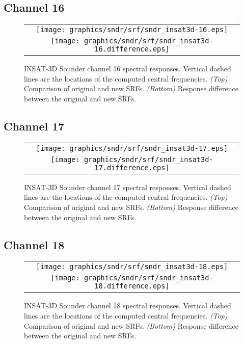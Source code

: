 \subsection{Channel 16}
\begin{figure}[H]
  \label{fig:sndr_ch16}
  \centering
  \begin{tabular}{c}
    \texttt{[image: graphics/sndr/srf/sndr\_insat3d-16.eps]} \\
    \texttt{[image: graphics/sndr/srf/sndr\_insat3d-16.difference.eps]}
  \end{tabular}
  \caption{INSAT-3D Sounder channel 16 spectral responses. Vertical dashed lines are the locations of the computed central frequencies. \emph{(Top)} Comparison of original and new SRFs. \emph{(Bottom)} Response difference between the original and new SRFs.}
\end{figure}

\subsection{Channel 17}
\begin{figure}[H]
  \label{fig:sndr_ch17}
  \centering
  \begin{tabular}{c}
    \texttt{[image: graphics/sndr/srf/sndr\_insat3d-17.eps]} \\
    \texttt{[image: graphics/sndr/srf/sndr\_insat3d-17.difference.eps]}
  \end{tabular}
  \caption{INSAT-3D Sounder channel 17 spectral responses. Vertical dashed lines are the locations of the computed central frequencies. \emph{(Top)} Comparison of original and new SRFs. \emph{(Bottom)} Response difference between the original and new SRFs.}
\end{figure}

\subsection{Channel 18}
\begin{figure}[H]
  \label{fig:sndr_ch18}
  \centering
  \begin{tabular}{c}
    \texttt{[image: graphics/sndr/srf/sndr\_insat3d-18.eps]} \\
    \texttt{[image: graphics/sndr/srf/sndr\_insat3d-18.difference.eps]}
  \end{tabular}
  \caption{INSAT-3D Sounder channel 18 spectral responses. Vertical dashed lines are the locations of the computed central frequencies. \emph{(Top)} Comparison of original and new SRFs. \emph{(Bottom)} Response difference between the original and new SRFs.}
\end{figure}
